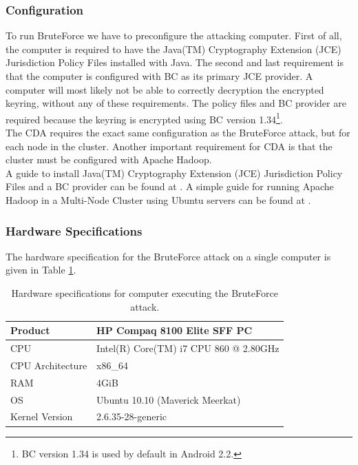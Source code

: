 \documentclass[pdftex,english,10pt,b5paper,twoside]{book}
\begin{document}
\subsubsection{Configuration}
To run BruteForce we have to preconfigure the attacking computer. First of
all, the computer is required to have the Java(TM) Cryptography Extension (JCE)
Jurisdiction Policy Files installed with Java. The second and last requirement is that
the computer is configured with \ac{BC} as its primary JCE provider.
A computer will most likely not be able to correctly decryption the encrypted
keyring, without any of these requirements. The policy files and BC provider are
required because the keyring is encrypted using BC version 1.34\footnote{BC version
1.34 is used by default in Android 2.2.}.\\

\noindent The CDA requires the exact same configuration as the BruteForce
attack, but for each node in the cluster. Another important requirement for CDA
is that the cluster must be configured with Apache Hadoop.\\

\noindent A guide to install Java(TM) Cryptography Extension (JCE) Jurisdiction
Policy Files and a BC provider can be found at \cite{jce+bc}. A simple guide for
running Apache Hadoop in a Multi-Node Cluster using Ubuntu servers can be found
at \cite{cluster}.

\subsubsection{Hardware Specifications}
The hardware specification for the BruteForce attack on a single computer is
given in Table \ref{tab:hwbf}.
\begin{table}[!h]
    \centering
    \caption{Hardware specifications for computer executing the BruteForce
    attack.}
    \label{tab:hwbf}
    \begin{tabular}{| l | l |}
	\hline
	Product		    &HP Compaq 8100 Elite SFF PC \\
	\hline
	CPU		    &Intel(R) Core(TM) i7 CPU 860 @ 2.80GHz\\
	\hline
	CPU Architecture    &x86\_64\\
	\hline
	RAM		    &4GiB\\
	\hline
	OS		    &Ubuntu 10.10 (Maverick Meerkat)\\
	\hline
	Kernel Version	    &2.6.35-28-generic\\
	\hline
    \end{tabular}
\end{table}
\end{document}
